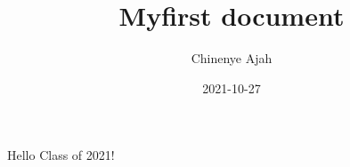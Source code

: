 \documentclass{article}
\title{Myfirst document}
\date{2021-10-27}
\author{Chinenye Ajah}
\begin{document}
	\maketitle
	\newpage
	Hello Class of 2021!
	
\end{document}
